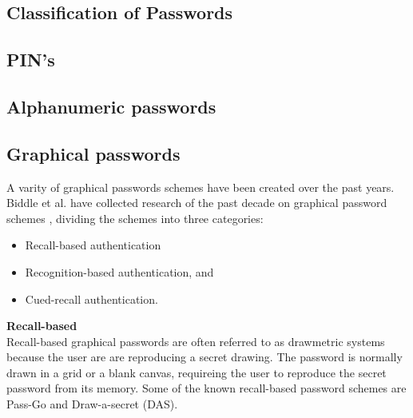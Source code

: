   \subsection{Classification of Passwords}

    \subsection*{PIN's}
    \subsection*{Alphanumeric passwords}
    \subsection*{Graphical passwords}

    A varity of graphical passwords schemes have been created over the past years. Biddle et al. have collected research of the past decade on graphical password schemes \cite{Biddle}, dividing the schemes into three categories: 

    \begin{itemize}
      \item Recall-based authentication
      \item Recognition-based authentication, and 
      \item Cued-recall authentication.
    \end{itemize}

    {\Large \bf Recall-based} \\
    
    Recall-based graphical passwords are often referred to as drawmetric systems \cite{DeAngeli} because the user are are reproducing a secret drawing. The password is normally drawn in a grid or a blank canvas, requireing the user to reproduce the secret password from its memory. Some of the known recall-based password schemes are Pass-Go and Draw-a-secret (DAS).

